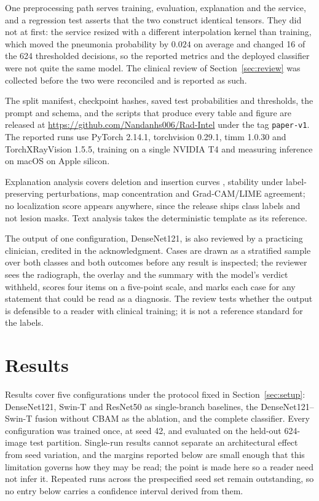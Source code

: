 \documentclass[conference]{IEEEtran}
\begin{document}
One preprocessing path serves training, evaluation, explanation and the
service, and a regression test asserts that the two construct identical
tensors. They did not at first: the service resized with a different
interpolation kernel than training, which moved the pneumonia probability by
$0.024$ on average and changed 16 of the 624 thresholded decisions, so the
reported metrics and the deployed classifier were not quite the same model.
The clinical review of Section~\ref{sec:review} was collected before the two
were reconciled and is reported as such.

The split manifest, checkpoint hashes, saved test probabilities and
thresholds, the prompt and schema, and the scripts that produce every table
and figure are released at \url{https://github.com/Nandanhs006/Rad-Intel}
under the tag \texttt{paper-v1}. The reported runs use PyTorch 2.14.1,
torchvision 0.29.1, timm 1.0.30 and TorchXRayVision 1.5.5, training on a
single NVIDIA T4 and measuring inference on macOS on Apple silicon.

Explanation analysis covers deletion and insertion curves
\cite{petsiuk2018rise}, stability under label-preserving perturbations, map
concentration and Grad-CAM/LIME agreement; no localization score appears
anywhere, since the release ships class labels and not lesion masks. Text
analysis takes the deterministic template as its reference.

The output of one configuration, DenseNet121, is also reviewed by a
practicing clinician, credited in the acknowledgment. Cases are drawn as a stratified sample over both classes and
both outcomes before any result is inspected; the reviewer sees the
radiograph, the overlay and the summary with the model's verdict withheld,
scores four items on a five-point scale, and marks each case for any
statement that could be read as a diagnosis. The review tests whether the
output is defensible to a reader with clinical training; it is not a
reference standard for the labels.

\section{Results}
\label{sec:results}
Results cover five configurations under the protocol fixed in
Section~\ref{sec:setup}: DenseNet121, Swin-T and ResNet50 as single-branch
baselines, the DenseNet121--Swin-T fusion without CBAM as the ablation, and
the complete classifier. Every configuration was trained
once, at seed 42, and evaluated on the held-out 624-image test partition.
Single-run results cannot separate an architectural effect from seed
variation, and the margins reported below are small enough that this
limitation governs how they may be read; the point is made here so a reader need not infer it. Repeated runs across the prespecified seed
set remain outstanding, so no entry below carries a confidence interval
derived from them.
\end{document}
